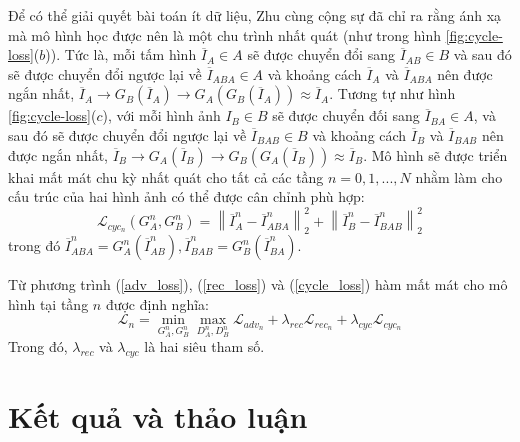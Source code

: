 \documentclass[12pt]{report}%
\begin{document}
Để có thể giải quyết bài toán ít dữ liệu, Zhu cùng cộng sự đã chỉ ra rằng ánh xạ mà mô hình học được nên là một chu trình nhất quát (như trong hình \ref{fig:cycle-loss}($b$)). Tức là, mỗi tấm hình $\overline{I}_A \in A$ sẽ được chuyển đổi sang $\overline{I}_{AB} \in B$ và sau đó sẽ được chuyển đổi ngược lại về $\overline{I}_{ABA} \in A$ và  khoảng cách $\overline{I}_A$ và $\overline{I}_{ABA}$ nên được ngắn nhất, $\overline{I}_A \to G_B\left( \overline{I}_A \right) \to G_A\left( {G_B\left( \overline{I}_A \right)} \right) \approx \overline{I}_A$. Tương tự như hình \ref{fig:cycle-loss}($c$), với mỗi hình ảnh $I_B \in B$ sẽ được chuyển đối sang $\overline{I}_{BA} \in A$, và sau đó sẽ được chuyển đổi ngược lại về $\overline{I}_{BAB} \in B$ và khoảng cách $\overline{I}_B$ và $\overline{I}_{BAB}$ nên được ngắn nhất, $\overline{I}_B \to G_A\left( \overline{I}_B \right) \to G_B\left( {G_A\left( \overline{I}_B \right)} \right) \approx \overline{I}_B$. Mô hình sẽ được triển khai mất mát chu kỳ nhất quát cho tất cả các tầng $n=0,1,..., N$ nhằm  làm cho cấu trúc của hai hình ảnh có thể được cân chỉnh phù hợp:
\begin{equation}\label{cycle_loss}
   \mathcal{L}_{cyc_n}\left(G_A ^n, G_B ^n \right) = \left\| {\overline I _A^n - \overline I _{ABA}^n} \right\|_2^2 + \left\| {\overline I _B^n - \overline I _{BAB}^n} \right\|_2^2 
\end{equation}
trong đó $\overline I _{ABA}^n = G_A^n\left( {\overline I _{AB}^n} \right),\overline I _{BAB}^n = G_B^n\left( {\overline I _{BA}^n} \right)$.


Từ phương trình (\ref{adv_loss}), (\ref{rec_loss}) và (\ref{cycle_loss}) hàm mất mát cho mô hình tại tầng $n$ được định nghĩa:
\begin{equation}
   \mathcal{L}_n = \mathop {\min }\limits_{G_A^n,G_B^n} \mathop {\max }\limits_{D_A^n,D_B^n} {\mathcal{L}_{ad{v_n}}} + {\lambda _{rec}}{\mathcal{L}_{re{c_n}}} + {\lambda _{cyc}}{\mathcal{L}_{cy{c_n}}} 
\end{equation}
Trong đó, $\lambda_{rec}$ và $\lambda_{cyc}$ là hai siêu tham số.

\clearpage
\chapter{Kết quả và thảo luận}
\label{result}
\end{document}
